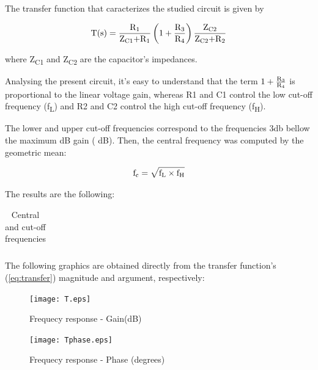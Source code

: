 The transfer function that caracterizes the studied circuit is given by

\begin{equation} \label{eq:transfer}
 \text{T(s)}=\frac{\text{R\textsubscript1}}{\text{Z\textsubscript{C1}+R\textsubscript1}} \left( 1+\frac{\text{R\textsubscript3}}{\text{R\textsubscript4}}\right) \frac{\text{Z\textsubscript{C2}}}{\text{Z\textsubscript{C2}+R\textsubscript2}}
\end{equation}

where Z\textsubscript{C1} and Z\textsubscript{C2} are the capacitor's impedances.

Analysing the present circuit, it's easy to understand that the term $ 1+\frac{\text{R\textsubscript3}}{\text{R\textsubscript4}}$ is proportional to the linear voltage gain, whereas R1 and C1 control the low cut-off frequency (f\textsubscript{L}) and R2 and C2 control the high cut-off frequency (f\textsubscript{H}).

The lower and upper cut-off frequencies correspond to the frequencies 3db bellow the maximum dB gain ( dB). Then, the central frequency was computed by the geometric mean:

\begin{equation}
 \text{f\textsubscript{c}}= \sqrt{\text{f\textsubscript{L}} \times \text{f\textsubscript{H}}}
\end{equation}

The results are the following:

\begin{table}[!htb]
\centering
  \begin{tabular}{|c | c|}
    \hline    
    
 \end{tabular}
 \caption{Central and cut-off frequencies}\label{tab:theo:frequencies}
\end{table}

The following graphics are obtained directly from the transfer function's (\ref{eq:transfer}) magnitude and argument, respectively:


\begin{figure}[h] \centering
  \begin{minipage}{.45\textwidth}
    \texttt{[image: T.eps]}
    \caption{Frequecy response - Gain(dB)}\label{fig:theo:gain}
  \end{minipage}%
    \hspace{2 mm}
  \begin{minipage}{.45\textwidth}
  \centering
    \texttt{[image: Tphase.eps]}
    \caption{Frequecy response - Phase (degrees)}\label{fig:theo:phase}
      \end{minipage}
\end{figure}
\newpage
